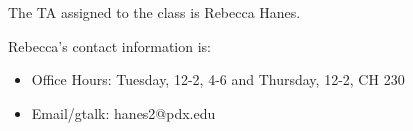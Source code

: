 The TA assigned to the class is Rebecca Hanes. 

Rebecca's contact information is:
\begin{itemize}
\item Office Hours: Tuesday, 12-2, 4-6 and Thursday, 12-2, CH 230
\item Email/gtalk: hanes2@pdx.edu
\end{itemize}
